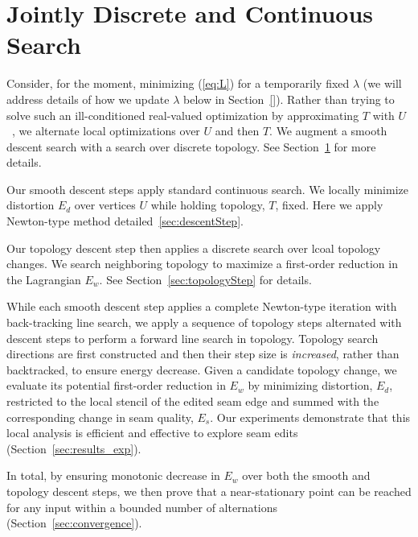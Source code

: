 
\section{Jointly Discrete and Continuous Search}
\label{sec:DCSearch}

Consider, for the moment, minimizing (\ref{eq:L}) for a temporarily fixed $\lambda$ (we will address details of how we update $\lambda$ below in Section\ \ref{}). Rather than trying to solve such an ill-conditioned real-valued optimization by approximating $T$ with $U$\ \cite{Poranne2017Autocuts}, we alternate local optimizations over $U$ and then $T$. We augment a smooth descent search with a search over discrete topology. See Section~\ref{sec:DCSearch} for more details.

Our smooth descent steps apply standard continuous search. We locally minimize distortion $E_d$ over vertices $U$ while holding topology, $T$, fixed. Here we apply Newton-type method detailed~\ref{sec:descentStep}.

Our topology descent step then applies a discrete search over lcoal topology changes. We search neighboring topology to maximize a first-order reduction in the Lagrangian $E_w$. See Section~\ref{sec:topologyStep} for details. 

While each smooth descent step applies a complete Newton-type iteration with back-tracking line search, we apply a sequence of topology steps alternated with descent steps to perform a forward line search in topology. Topology search directions are first constructed and then their step size is \emph{increased}, rather than backtracked, to ensure 
energy decrease. Given a candidate topology change, we evaluate its potential first-order reduction in $E_w$ by minimizing distortion, $E_d$, restricted to the local stencil of the edited seam edge and summed with the corresponding change in seam quality, $E_s$. Our experiments demonstrate that this local analysis is efficient and effective to explore seam edits (Section~\ref{sec:results_exp}).

In total, by ensuring monotonic decrease in $E_w$ over both the smooth and topology descent steps, we then prove that a near-stationary point can be reached for any input within a bounded number of alternations (Section~\ref{sec:convergence}).  

